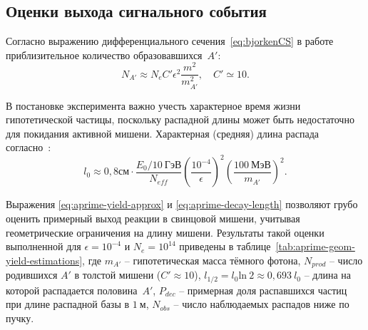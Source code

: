 \begin{comment}
\begin{equation}
\frac{d \sigma ( e(k) + Z(p) \rightarrow e(k') + A'(q) + Z(p') )}{ dE_{A'} d \cos \theta_{A'} } =
    \frac{ \alpha \chi }{ \pi } \frac{E_0 x \beta_{A'}}{1 - x} \frac{ d \sigma (p + q \rightarrow p' + k) }{d (p k)},
\end{equation}

где $x = E_{A'}/E_0$, $t = - q^2$, $\beta_{A'} = \sqrt(1 - m_{A'}^2/E_0^2)$.


\end{comment}

\subsection{Оценки выхода сигнального события}

Согласно выражению дифференциального сечения~\eqref{eq:bjorkenCS}
в работе~\cite{bjorken} приблизительное количество
образовавшихся~$A'$:
\begin{equation}
    N_{A'} \approx N_e C' \epsilon^2 \frac{m^2}{m^2_{A'}}, \quad C' \simeq 10.
    \label{eq:aprime-yield-approx}
\end{equation}

В постановке эксперимента важно учесть характерное время
жизни гипотетической частицы, поскольку распадной длины может
быть недостаточно для покидания активной мишени. Характерная
(средняя) длина распада согласно~\cite{bjorken}:
\begin{equation}
    l_0 \approx 0{,}8 \text{см} \cdot \frac{E_0 / 10 ~\text{ГэВ}}{N_{eff}}
        \left( \frac{10^{-4}}{\epsilon} \right)^2 \left( \frac{100~\text{МэВ}}{m_{A'}} \right)^2.
    \label{eq:aprime-decay-length}
\end{equation}

Выражения \eqref{eq:aprime-yield-approx} и \eqref{eq:aprime-decay-length}
позволяют грубо оценить примерный выход реакции в свинцовой мишени,
учитывая геометрические ограничения на длину мишени. Результаты
такой оценки выполненной для $\epsilon = 10^{-4}$ и $N_{e} = 10^{14}$ приведены в
таблице~\ref{tab:aprime-geom-yield-estimations}, где
$m_{A'}$ -- гипотетическая масса тёмного фотона,
$N_{prod}$ -- число родившихся $A'$ в толстой мишени ($C'\approx 10$),
$l_{1/2} = l_0 \text{ln}~2 \approx 0{,}693 ~ l_0$ -- длина
на которой распадается половина~$A'$,
$P_{dec}$ -- примерная доля распавшихся частиц при длине распадной базы
в $1~\mathrm{м}$,
$N_{obs}$ -- число наблюдаемых распадов ниже по пучку.

